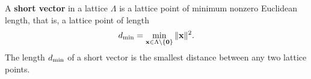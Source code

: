 
A \textbf{short vector} in a lattice $\Lambda$ is a lattice point of minimum nonzero Euclidean length, that is, a lattice point of length
\[
d_{\text{min}} =  \min_{\mathbf{x} \in \Lambda \backslash \{ \boldsymbol{0} \} } \| \mathbf{x} \|^2.
\]   
The length $d_{\text{min}}$ of a short vector is the smallest distance between any two lattice points. 

%
	
